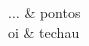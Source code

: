 \listoffigures*

\begin{listadesimbolos}
$\dots$ & pontos \\
oi & techau
\end{listadesimbolos}

\tableofcontents*%